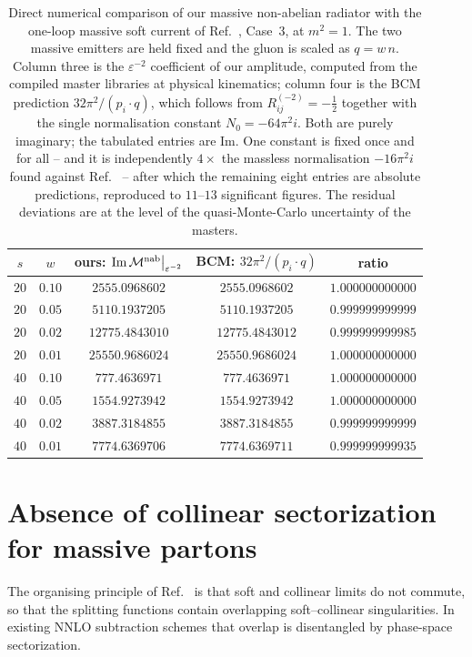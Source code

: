 \documentclass[11pt,a4paper]{article}
\newcommand{\eps}{\varepsilon}
\begin{document}
\begin{table}[htbp]
\centering
\caption{Direct numerical comparison of our massive non-abelian radiator with the
one-loop massive soft current of Ref.~\cite{BCM}, Case~3, at $m^2=1$. The two
massive emitters are held fixed and the gluon is scaled as $q=w\,n$. Column three
is the $\eps^{-2}$ coefficient of our amplitude, computed from the compiled master
libraries at physical kinematics; column four is the BCM prediction
$32\pi^2/(p_i\!\cdot\!q)$, which follows from $R^{(-2)}_{ij}=-\tfrac12$ together
with the single normalisation constant $N_0=-64\pi^2 i$. Both are purely
imaginary; the tabulated entries are $\mathrm{Im}$. One constant is fixed once and
for all  --  and it is independently $4\times$ the massless normalisation
$-16\pi^2 i$ found against Ref.~\cite{Campbell:2025}  --  after which the remaining
eight entries are absolute predictions, reproduced to $11$--$13$ significant
figures. The residual deviations are at the level of the quasi-Monte-Carlo
uncertainty of the masters.}
\label{tab:bcm}
\begin{tabular}{ccccc}
\toprule
$s$ & $w$ & ours: $\mathrm{Im}\,\mathcal{M}^{\rm nab}\big|_{\eps^{-2}}$
    & BCM: $32\pi^2/(p_i\!\cdot\!q)$ & ratio\\
\midrule
$20$ & $0.10$ & $2555.0968602$ & $2555.0968602$ & $1.000000000000$\\
$20$ & $0.05$ & $5110.1937205$ & $5110.1937205$ & $0.999999999999$\\
$20$ & $0.02$ & $12775.4843010$ & $12775.4843012$ & $0.999999999985$\\
$20$ & $0.01$ & $25550.9686024$ & $25550.9686024$ & $1.000000000000$\\
$40$ & $0.10$ & $777.4636971$ & $777.4636971$ & $1.000000000000$\\
$40$ & $0.05$ & $1554.9273942$ & $1554.9273942$ & $1.000000000000$\\
$40$ & $0.02$ & $3887.3184855$ & $3887.3184855$ & $0.999999999999$\\
$40$ & $0.01$ & $7774.6369706$ & $7774.6369711$ & $0.999999999935$\\
\bottomrule
\end{tabular}
\end{table}

\section{Absence of collinear sectorization for massive partons}
\label{sec:nosector}
The organising principle of Ref.~\cite{Campbell:2025} is that soft and collinear
limits do not commute, so that the splitting functions contain overlapping
soft--collinear singularities. In existing NNLO subtraction schemes that overlap
is disentangled by phase-space sectorization.
\end{document}
